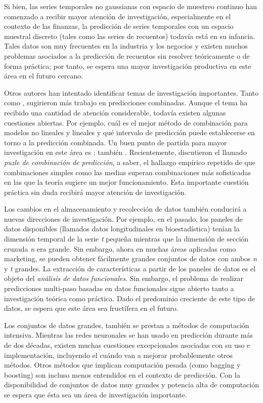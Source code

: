 \documentclass{llncs}
\begin{document}
Si bien, las series temporales no gaussianas con espacio de muestreo continuo han comenzado a recibir mayor atención de investigación, especialmente en el contexto de las  finanzas, la predicción de series temporales con un espacio muestral discreto (tales como las series de recuentos) todavía está en su infancia. Tales datos son muy frecuentes en la industria y los negocios y existen muchos problemas asociados a la predicción de recuentos sin resolver teóricamente o de forma práctica; por tanto, se espera una mayor investigación productiva en este área en el futuro cercano.

Otros autores han intentado identificar temas de investigación importantes. Tanto \cite{deGooijer1990449} como \cite{Clements20031}, sugirieron más trabajo en predicciones combinadas. Aunque el tema ha recibido una cantidad de atención considerable, todavía existen algunas cuestiones abiertas. Por ejemplo, cuál es el mejor método de combinación para modelos no lineales y lineales y qué intervalo de predicción puede establecerse en torno a la predicción combinada. Un buen punto de partida para mayor investigación en este área es \cite{Terasvirta2006}; también \cite{Armstrong2001}. Recientemente, \cite{Stock2004405} discutieron el llamado \emph{puzle de combinación de predicción}, a saber, el hallazgo empírico repetido de que combinaciones simples como las medias superan combinaciones más sofisticadas en las que la teoría sugiere un mejor funcionamiento. Esta importante cuestión práctica sin duda recibirá mayor atención de investigación.

Los cambios en el almacenamiento y recolección de datos también conducirá a nuevas direcciones de investigación. Por ejemplo, en el pasado, los paneles de datos disponibles (llamados datos longitudinales en bioestadística) tenían la dimensión temporal de la serie \emph{t} pequeña mientras que la dimensión de sección cruzada \emph{n} era grande. Sin embargo, ahora en muchas áreas aplicadas como marketing, se pueden obtener fácilmente grandes conjuntos de datos con ambos \emph{n} y \emph{t} grandes. La extracción de características a partir de los paneles de datos es el objeto del \emph{análisis de datos funcionales}. Sin embargo, el problema de realizar predicciones multi-paso basadas en datos funcionales sigue abierto tanto a investigación teórica como práctica. Dado el predominio creciente de este tipo de datos, se espera que este área sea fructífera en el futuro.

Los conjuntos de datos grandes, también se prestan a métodos de computación intensiva. Mientras las redes neuronales se han usado en predicción durante más de dos décadas, existen muchas cuestiones excepcionales asociadas con su uso e implementación, incluyendo el cuándo van a mejorar probablemente otros métodos. Otros métodos que implican computación pesada (como bagging y boosting) son incluso menos entendidos en el contexto de predicción. Con la disponibilidad de conjuntos de datos muy grandes y potencia alta de computación se espera que ésta sea un área de investigación importante.
\end{document}
